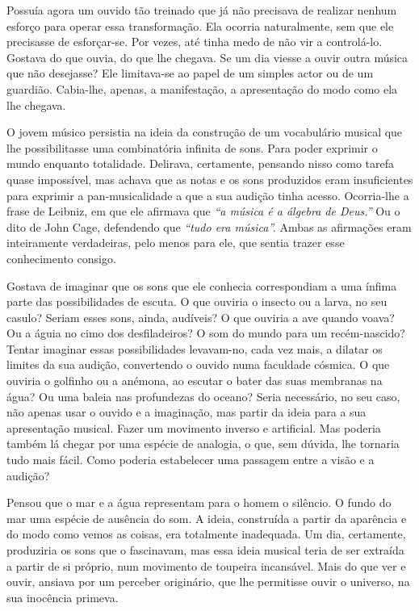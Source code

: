 Possuía agora um ouvido tão treinado que já não precisava de realizar
nenhum esforço para operar essa transformação. Ela ocorria naturalmente,
sem que ele precisasse de esforçar-se. Por vezes, até tinha medo de não
vir a controlá-lo. Gostava do que ouvia, do que lhe chegava. Se um dia
viesse a ouvir outra música que não desejasse? Ele limitava-se ao papel
de um simples actor ou de um guardião. Cabia-lhe, apenas, a
manifestação, a apresentação do modo como ela lhe chegava.

O jovem músico persistia na ideia da construção de um vocabulário
musical que lhe possibilitasse uma combinatória infinita de sons. Para
poder exprimir o mundo enquanto totalidade. Delirava, certamente,
pensando nisso como tarefa quase impossível, mas achava que as notas e
os sons produzidos eram insuficientes para exprimir a pan-musicalidade a
que a sua audição tinha acesso. Ocorria-lhe a frase de Leibniz, em que
ele afirmava que \emph{``a música é a álgebra de Deus.''} Ou o dito de
John Cage, defendendo que \emph{``tudo era música''.} Ambas as
afirmações eram inteiramente verdadeiras, pelo menos para ele, que
sentia trazer esse conhecimento consigo.

Gostava de imaginar que os sons que ele conhecia correspondiam a uma
ínfima parte das possibilidades de escuta. O que ouviria o insecto ou a
larva, no seu casulo? Seriam esses sons, ainda, audíveis? O que ouviria
a ave quando voava? Ou a águia no cimo dos desfiladeiros? O som do mundo
para um recém-nascido? Tentar imaginar essas possibilidades levavam-no,
cada vez mais, a dilatar os limites da sua audição, convertendo o ouvido
numa faculdade cósmica. O que ouviria o golfinho ou a anémona, ao
escutar o bater das suas membranas na água? Ou uma baleia nas
profundezas do oceano? Seria necessário, no seu caso, não apenas usar o
ouvido e a imaginação, mas partir da ideia para a sua apresentação
musical. Fazer um movimento inverso e artificial. Mas poderia também lá
chegar por uma espécie de analogia, o que, sem dúvida, lhe tornaria tudo
mais fácil. Como poderia estabelecer uma passagem entre a visão e a
audição?

Pensou que o mar e a água representam para o homem o silêncio. O fundo
do mar uma espécie de ausência do som. A ideia, construída a partir da
aparência e do modo como vemos as coisas, era totalmente inadequada. Um
dia, certamente, produziria os sons que o fascinavam, mas essa ideia
musical teria de ser extraída a partir de si próprio, num movimento de
toupeira incansável. Mais do que ver e ouvir, ansiava por um perceber
originário, que lhe permitisse ouvir o universo, na sua inocência
primeva.

